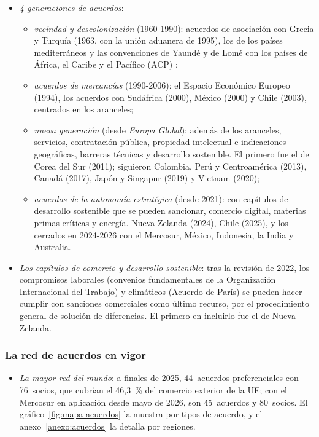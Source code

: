 \documentclass[11pt]{article}
\begin{document}
\begin{itemize}
\item \emph{4 generaciones de acuerdos}:
  \begin{itemize}
  \item \emph{vecindad y descolonización} (1960-1990): acuerdos de asociación con Grecia y Turquía (1963, con la unión aduanera de 1995), los de los países mediterráneos y las convenciones de Yaundé y de Lomé con los países de África, el Caribe y el Pacífico (ACP) ;
  \item \emph{acuerdos de mercancías} (1990-2006): el Espacio Económico Europeo (1994), los acuerdos con Sudáfrica (2000), México (2000) y Chile (2003), centrados en los aranceles;
  \item \emph{nueva generación} (desde \emph{Europa Global}): además de los aranceles, servicios, contratación pública, propiedad intelectual e indicaciones geográficas, barreras técnicas y desarrollo sostenible. El primero fue el de Corea del Sur (2011); siguieron Colombia, Perú y Centroamérica (2013), Canadá (2017), Japón y Singapur (2019) y Vietnam (2020);
  \item \emph{acuerdos de la autonomía estratégica} (desde 2021): con capítulos de desarrollo sostenible que se pueden sancionar, comercio digital, materias primas críticas y energía. Nueva Zelanda (2024), Chile (2025), y los cerrados en 2024-2026 con el Mercosur, México, Indonesia, la India y Australia.
  \end{itemize}
\item \emph{Los capítulos de comercio y desarrollo sostenible}: tras la revisión de 2022\nocite{CE2022TSD}, los compromisos laborales (convenios fundamentales de la Organización Internacional del Trabajo) y climáticos (Acuerdo de París) se pueden hacer cumplir con sanciones comerciales como último recurso, por el procedimiento general de solución de diferencias. El primero en incluirlo fue el de Nueva Zelanda.
\end{itemize}

\subsubsection{La red de acuerdos en vigor}\label{sec:red}

\begin{itemize}
\item \emph{La mayor red del mundo}: a finales de 2025, 44~acuerdos preferenciales con 76~socios, que cubrían el 46,3~\% del comercio exterior de la UE; con el Mercosur en aplicación desde mayo de 2026, son 45~acuerdos y 80~socios\nocite{CE2026Informe}. El gráfico~\ref{fig:mapa-acuerdos} la muestra por tipos de acuerdo, y el anexo~\ref{anexo:acuerdos} la detalla por regiones.
\end{itemize}
\end{document}
